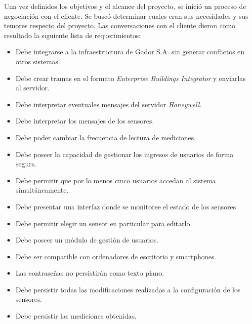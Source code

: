 Una vez definidos los objetivos y el alcance del proyecto, se inició un proceso de negociación con el cliente.
Se buscó determinar cuales eran sus necesidades y sus temores respecto del proyecto.
Las conversaciones con el cliente dieron como resultado la siguiente lista de requerimientos:

\newpage

\begin{itemize}
	\item Debe integrarse a la infraestructura de Gador S.A. sin generar conflictos en otros sistemas.
	\item Debe crear tramas en el formato \emph{Enterprise Buildings Integrator} y enviarlas al servidor.
	\item Debe interpretar eventuales mensajes del servidor \emph{Honeywell}.
	\item Debe interpretar los mensajes de los sensores.
	\item Debe poder cambiar la frecuencia de lectura de mediciones.
	\item Debe poseer la capacidad de gestionar los ingresos de usuarios de forma segura.
	\item Debe permitir que por lo menos cinco usuarios accedan al sistema simultáneamente.
	\item Debe presentar una interfaz donde se monitoree el estado de los sensores
	\item Debe permitir elegir un sensor en particular para editarlo.
	\item Debe poseer un módulo de gestión de usuarios.
	\item Debe ser compatible con ordenadores de escritorio y smartphones.
	\item Las contraseñas no persistirán como texto plano.
	\item Debe persistir todas las modificaciones realizadas a la configuración de los sensores.
	\item Debe persistir las mediciones obtenidas.
\end{itemize}